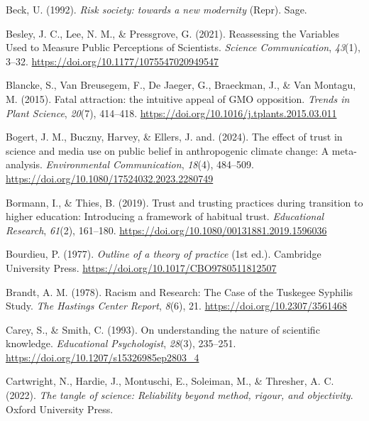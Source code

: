 \documentclass[
  man,
  floatsintext,
  longtable,
  nolmodern,
  notxfonts,
  notimes,
  colorlinks=true,linkcolor=blue,citecolor=blue,urlcolor=blue]{apa7}
\newlength{\cslhangindent}
\newenvironment{CSLReferences}[2] %
 {\begin{list}{}{%
  \setlength{\itemindent}{0pt}
  \setlength{\leftmargin}{0pt}
  \setlength{\parsep}{0pt}
  \ifodd #1
   \setlength{\leftmargin}{\cslhangindent}
   \setlength{\itemindent}{-1\cslhangindent}
  \fi
  \setlength{\itemsep}{#2\baselineskip}}}
 {\end{list}}
\begin{document}
\begin{CSLReferences}{1}{0}
Beck, U. (1992). \emph{Risk society: towards a new modernity} (Repr).
Sage.

Besley, J. C., Lee, N. M., \& Pressgrove, G. (2021). Reassessing the
Variables Used to Measure Public Perceptions of Scientists.
\emph{Science Communication}, \emph{43}(1), 3--32.
\url{https://doi.org/10.1177/1075547020949547}

Blancke, S., Van Breusegem, F., De Jaeger, G., Braeckman, J., \& Van
Montagu, M. (2015). Fatal attraction: the intuitive appeal of GMO
opposition. \emph{Trends in Plant Science}, \emph{20}(7), 414--418.
\url{https://doi.org/10.1016/j.tplants.2015.03.011}

Bogert, J. M., Buczny, Harvey, \& Ellers, J. and. (2024). The effect of
trust in science and media use on public belief in anthropogenic climate
change: A meta-analysis. \emph{Environmental Communication},
\emph{18}(4), 484--509.
\url{https://doi.org/10.1080/17524032.2023.2280749}

Bormann, I., \& Thies, B. (2019). Trust and trusting practices during
transition to higher education: Introducing a framework of habitual
trust. \emph{Educational Research}, \emph{61}(2), 161--180.
\url{https://doi.org/10.1080/00131881.2019.1596036}

Bourdieu, P. (1977). \emph{Outline of a theory of practice} (1st ed.).
Cambridge University Press.
\url{https://doi.org/10.1017/CBO9780511812507}

Brandt, A. M. (1978). Racism and Research: The Case of the Tuskegee
Syphilis Study. \emph{The Hastings Center Report}, \emph{8}(6), 21.
\url{https://doi.org/10.2307/3561468}

Carey, S., \& Smith, C. (1993). On understanding the nature of
scientific knowledge. \emph{Educational Psychologist}, \emph{28}(3),
235--251. \url{https://doi.org/10.1207/s15326985ep2803_4}

Cartwright, N., Hardie, J., Montuschi, E., Soleiman, M., \& Thresher, A.
C. (2022). \emph{The tangle of science: Reliability beyond method,
rigour, and objectivity}. Oxford University Press.


\end{CSLReferences}
\end{document}
